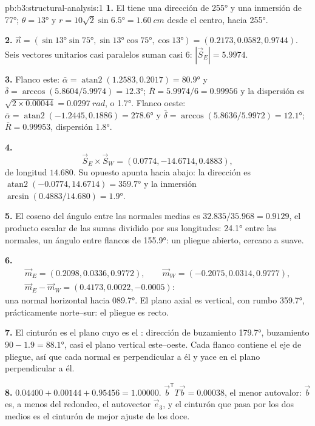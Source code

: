 \begin{solution}{pb:b3:structural-analysis:1}
\textbf{1.} El  tiene una dirección de \ang{255} y una inmersión de \ang{77}; $\theta =
\ang{13}$ y $r = 10\sqrt2\sin\ang{6.5} = \qty{1.60}{cm}$ desde el centro,
hacia \ang{255}.

\textbf{2.} $\vec n = (\sin\ang{13}\sin\ang{75}, \sin\ang{13}\cos\ang{75},
\cos\ang{13}) = (0.2173, 0.0582, 0.9744)$. Seis vectores unitarios casi paralelos
suman casi 6: $|\vec S_E| = 5.9974$.

\textbf{3.} Flanco este: $\bar\alpha = \operatorname{atan2}(1.2583, 0.2017) =
\ang{80.9}$ y $\bar\delta = \arccos(5.8604/5.9974) = \ang{12.3}$; $\bar R
= 5.9974/6 = 0.99956$ y la dispersión es $\sqrt{2\times0.00044} =
\qty{0.0297}{rad}$, o \ang{1.7}. Flanco oeste: $\bar\alpha =
\operatorname{atan2}(-1.2445, 0.1886) = \ang{278.6}$ y $\bar\delta =
\arccos(5.8636/5.9972) = \ang{12.1}$; $\bar R = 0.99953$, dispersión \ang{1.8}.

\textbf{4.}
\[
  \vec S_E\times\vec S_W = (0.0774, -14.6714, 0.4883),
\]
de longitud $14.680$. Su opuesto apunta hacia abajo: la dirección es $\operatorname{atan2}(-0.0774, 14.6714) = \ang{359.7}$ y la
inmersión $\arcsin(0.4883/14.680) = \ang{1.9}$.

\textbf{5.} El coseno del ángulo entre las normales medias es
$32.835/35.968 = 0.9129$, el producto escalar de las sumas dividido por sus
longitudes: \ang{24.1} entre las normales, un ángulo entre flancos de \ang{155.9}:
un pliegue abierto, cercano a suave.

\textbf{6.}
\begin{gather*}
  \vec m_E = (0.2098, 0.0336, 0.9772),\qquad \vec m_W = (-0.2075, 0.0314, 0.9777),\\
  \vec m_E - \vec m_W = (0.4173, 0.0022, -0.0005):
\end{gather*}
una normal horizontal hacia \ang{089.7}. El plano axial es vertical, con rumbo
\ang{359.7}, prácticamente norte--sur: el pliegue es recto.

\textbf{7.} El cinturón es el plano cuyo  es el : dirección de buzamiento
\ang{179.7}, buzamiento $90 - 1.9 = \ang{88.1}$, casi el plano vertical este--oeste.
Cada flanco contiene el eje de pliegue, así que cada normal es perpendicular a
él y yace en el plano perpendicular a él.

\textbf{8.} $0.04400 + 0.00144 + 0.95456 = 1.00000$. $\vec b^{\mathsf T}T\vec
b = 0.00038$, el menor autovalor: $\vec b$ es, a menos del redondeo, el
autovector $\vec e_3$, y el cinturón que pasa por los dos  medios es el
cinturón de mejor ajuste de los doce.


\end{solution}
